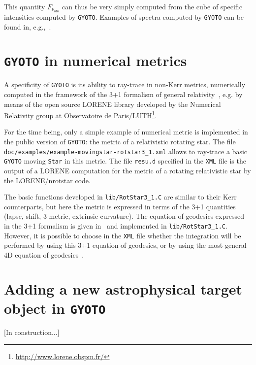 \documentclass[a4paper,12pt]{article}
\begin{document}
This quantity $F_{\nu_{\mathrm{obs}}}$ can thus be very simply computed from the cube of specific intensities computed by \texttt{GYOTO}. Examples of spectra computed by \texttt{GYOTO} can be found in, e.g.,~\citet{straub12}.


\section{\texttt{GYOTO} in numerical metrics}
\label{3+1}

A specificity of \texttt{GYOTO} is its ability to ray-trace in non-Kerr metrics, numerically computed in the framework of the 3+1 formalism of general relativity~\citep{gourgoulhon12}, e.g. by means of the open source LORENE library developed by the Numerical Relativity group at Observatoire de Paris/LUTH\footnote{\url{http://www.lorene.obspm.fr/}}. 

\begin{sloppypar}
For the time being, only a simple example of numerical metric is implemented in the public version of \texttt{GYOTO}: the metric of a relativistic rotating star. The file \texttt{doc/examples/example-movingstar-rotstar3\_1.xml} allows to ray-trace a basic \texttt{GYOTO} moving \texttt{Star} in this metric. The file \texttt{resu.d} specified in the \texttt{XML} file is the output of a LORENE computation for the metric of a rotating relativistic star by the LORENE/nrotstar code.
\end{sloppypar}

The basic functions developed in \texttt{lib/RotStar3\_1.C} are similar to their Kerr counterparts, but here the metric is expressed in terms of the 3+1 quantities (lapse, shift, 3-metric, extrinsic curvature). The equation of geodesics expressed in the 3+1 formalism is given in~\citet{vincent12a} and implemented in \texttt{lib/RotStar3\_1.C}. However, it is possible to choose in the \texttt{XML} file whether the integration will be performed by using this 3+1 equation of geodesics, or by using the most general 4D equation of geodesics~\citep[see][for a comparison of the two methods]{vincent11a}.

\section{Adding a new astrophysical target object in \texttt{GYOTO}}
\label{newastrobj}

[In construction...]



\end{document}
